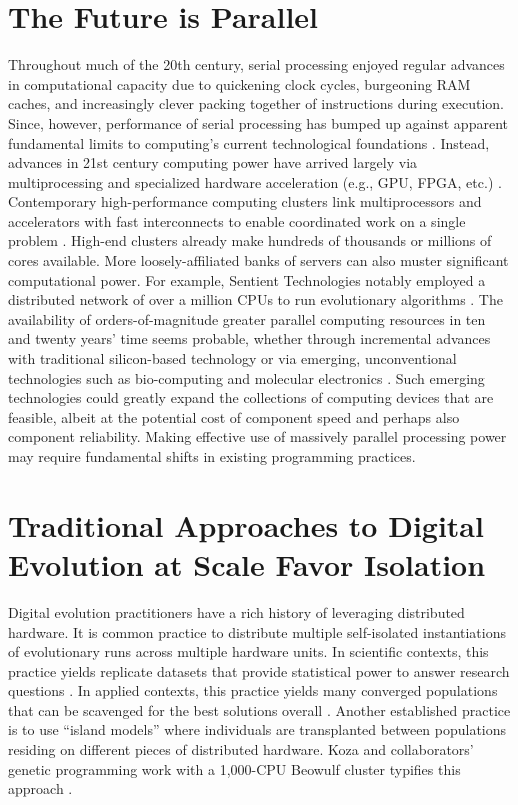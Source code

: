 \section{The Future is Parallel}

Throughout much of the 20th century, serial processing enjoyed regular advances in computational capacity due to quickening clock cycles, burgeoning RAM caches, and increasingly clever packing together of instructions during execution.
Since, however, performance of serial processing has bumped up against apparent fundamental limits to computing’s current technological foundations \citep{sutter2005free}.
Instead, advances in 21st century computing power have arrived largely via multiprocessing \citep[p.~55]{hennessy2011computer} and specialized hardware acceleration (e.g., GPU, FPGA, etc.) \citep{che2008accelerating}.
Contemporary high-performance computing clusters link multiprocessors and accelerators with fast interconnects to enable coordinated work on a single problem \citep[p.~436]{hennessy2011computer}.
High-end clusters already make hundreds of thousands or millions of cores available.
More loosely-affiliated banks of servers can also muster significant computational power.
For example, Sentient Technologies notably employed a distributed network of over a million CPUs to run evolutionary algorithms \citep{miikkulainen2019evolving}.
The availability of orders-of-magnitude greater parallel computing resources in ten and twenty years’ time seems probable, whether through incremental advances with traditional silicon-based technology \citep{gropp2013programming,dongarra2014applied} or via emerging, unconventional technologies such as bio-computing \citep{benenson2009biocomputers} and molecular electronics \citep{xiang2016molecular}.
Such emerging technologies could greatly expand the collections of computing devices that are feasible, albeit at the potential cost of component speed \citep{bonnet2013amplifying, ellenbogen2000architectures} and perhaps also component reliability.
Making effective use of massively parallel processing power may require fundamental shifts in existing programming practices.

\section{Traditional Approaches to Digital Evolution at Scale Favor Isolation}

Digital evolution practitioners have a rich history of leveraging distributed hardware.
It is common practice to distribute multiple self-isolated instantiations of evolutionary runs across multiple hardware units.
In scientific contexts, this practice yields replicate datasets that provide statistical power to answer research questions \citep{dolson2017spatial}.
In applied contexts, this practice yields many converged populations that can be scavenged for the best solutions overall \citep{hornby2006automated}.
Another established practice is to use ``island models'' where individuals are transplanted between populations residing on different pieces of distributed hardware.
Koza and collaborators’ genetic programming work with a 1,000-CPU Beowulf cluster typifies this approach \citep{bennett1999building}.

